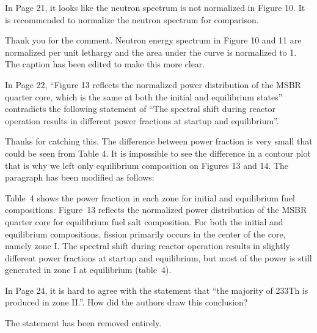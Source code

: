 \documentclass[answers,11pt]{exam}
\begin{document}
\begin{questions}
        \question  In Page 21, it looks like the neutron spectrum is not 
        normalized in Figure 10. It is recommended to normalize the neutron 
        spectrum for comparison.
        \begin{solution}
                Thank you for the comment. Neutron energy spectrum in Figure 
                10 and 11 are normalized per unit lethargy and the area under 
                the curve is normalized to 1. The caption has been edited to 
                make this more clear.
        \end{solution}

        \question  In Page 22, ``Figure 13 reflects the normalized power 
        distribution of the MSBR quarter core, which is the same at both the 
        initial and equilibrium states'' contradicts the following statement of 
        ``The spectral shift during reactor operation results in different power 
        fractions at startup and equilibrium''.
        \begin{solution}
                Thanks for catching this. The difference between power fraction
                 is very small that could be seen from Table 4. It is impossible
                  to see the difference in a contour plot that is why we left only 
                 equilibrium composition on Figures 13 and 14. The paragraph has 
                 been modified as follows:
                 
                 Table~4 shows the power fraction in each zone for initial and 
                 equilibrium fuel compositions. Figure~13 reflects the 
                 normalized power distribution of the \gls{MSBR} quarter core 
                 for equilibrium fuel salt composition. For both the initial 
                 and equilibrium compositions, fission primarily occurs in the 
                 center of the core, namely zone I. The spectral shift during 
                 reactor operation results in slightly different power 
                 fractions at startup and equilibrium, but most of the power is 
                 still generated in zone I at equilibrium (table~4).
                   
        \end{solution}

        \question  In Page 24, it is hard to agree with the statement that ``the 
        majority of 233Th is produced in zone II.''. How did the authors draw 
        this conclusion?
        \begin{solution}
                The statement has been removed entirely.
        \end{solution}


\end{questions}
\end{document}
